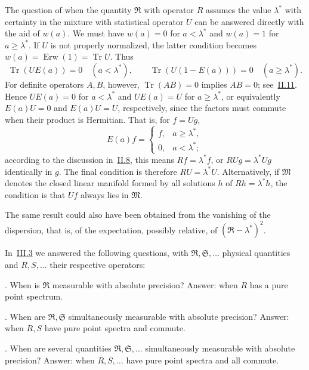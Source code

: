 \documentclass[fontsize=13pt,twoside,openany,headings=normal,parskip=false,bookmarkpackage=false,DIV=calc]{scrbook}
\begin{document}
The question of when the quantity $\mathfrak R$ with operator $R$ assumes the value $\lambda^*$ with certainty in the mixture with statistical operator $U$ can be answered directly with the aid of $w(a)$. We must have $w(a)=0$ for $a<\lambda^*$ and $w(a)=1$ for $a\geq\lambda^*$. If $U$ is not properly normalized, the latter condition becomes $w(a)=\operatorname{Erw}(1)=\operatorname{Tr}U$. Thus
\[
\operatorname{Tr}(UE(a))=0\quad(a<\lambda^*),\qquad
\operatorname{Tr}(U(1-E(a)))=0\quad(a\geq\lambda^*).
\]
For definite operators $A,B$, however, $\operatorname{Tr}(AB)=0$ implies $AB=0$; see~\hyperref[sec:II.11]{II.11}. Hence $UE(a)=0$ for $a<\lambda^*$ and $UE(a)=U$ for $a\geq\lambda^*$, or equivalently $E(a)U=0$ and $E(a)U=U$, respectively, since the factors must commute when their product is Hermitian. That is, for $f=Ug$,
\[
E(a)f=\begin{cases}f,&a\geq\lambda^*,\\0,&a<\lambda^*;\end{cases}
\]
according to the discussion in~\hyperref[sec:II.8]{II.8},
\hypertarget{origpage-177}{}%
this means $Rf=\lambda^*f$, or $RUg=\lambda^*Ug$ identically in $g$. The final condition is therefore $RU=\lambda^*U$. Alternatively, if $\mathfrak M$ denotes the closed linear manifold formed by all solutions $h$ of $Rh=\lambda^*h$, the condition is that $Uf$ always lies in $\mathfrak M$.

The same result could also have been obtained from the vanishing of the dispersion, that is, of the expectation, possibly relative, of $(\mathfrak R-\lambda^*)^2$.

In~\hyperref[sec:III.3]{III.3} we answered the following questions, with $\mathfrak R,\mathfrak S,\ldots$ physical quantities and $R,S,\ldots$ their respective operators:

\noindent{}.\label{criterion:IV.3.1} When is $\mathfrak R$ measurable with absolute precision? Answer: when $R$ has a pure point spectrum.

\noindent{}.\label{criterion:IV.3.2} When are $\mathfrak R,\mathfrak S$ simultaneously measurable with absolute precision? Answer: when $R,S$ have pure point spectra and commute.

\noindent{}.\label{criterion:IV.3.3} When are several quantities $\mathfrak R,\mathfrak S,\ldots$ simultaneously measurable with absolute precision? Answer: when $R,S,\ldots$ have pure point spectra and all commute.
\end{document}
